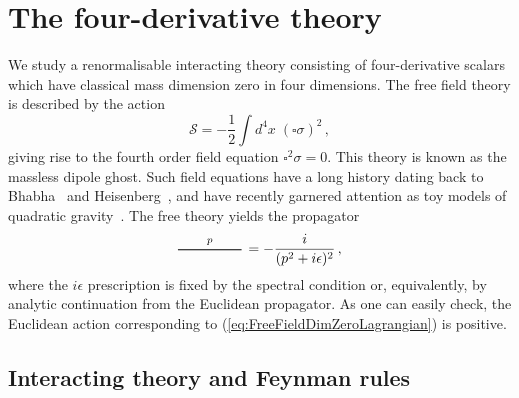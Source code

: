\documentclass[a4paper,11pt]{article}
\begin{document}
\section{The four-derivative theory}
\label{sec:Background}

We study a renormalisable interacting theory consisting of four-derivative scalars which have classical mass dimension zero in four dimensions. The free field theory is described by the action
\begin{equation}\label{eq:FreeFieldDimZeroLagrangian}
    \mathcal{S} = - \frac12\int d^4x \; (\square \sigma)^2 \,,
\end{equation}
giving rise to the fourth order field equation $\square^2\sigma=0$. This theory is known as the massless dipole ghost. Such field equations have a long history dating back to Bhabha~\cite{bhabha1950nuclear} and Heisenberg~\cite{heisenberg1957lee}, and have recently garnered attention as toy models of quadratic gravity~\cite{Bender:2007wu,Bender:2008gh,Donoghue:2021cza,Donoghue:2021eto,Donoghue:2021meq,Holdom:2015kbf,Holdom:2021hlo,Holdom:2023usn,Holdom:2024cfq}. The free theory yields the propagator
\begin{equation}
    \begin{tikzpicture}[scale=0.8,baseline={([yshift=-1.77ex]current bounding box.center)}]
        \draw[thick] (-1,0)--(1,0);
        \node at (0,0) [above] {\scriptsize$p$};
    \end{tikzpicture} \, = -\frac{i}{(p^2+i\epsilon)^2} \,,
\end{equation}
where the $i\epsilon$ prescription is fixed by the spectral condition or, equivalently, by analytic continuation from the Euclidean propagator. As one can easily check, the Euclidean action corresponding to (\ref{eq:FreeFieldDimZeroLagrangian}) is positive. 

\subsection{Interacting theory and Feynman rules}
\end{document}

